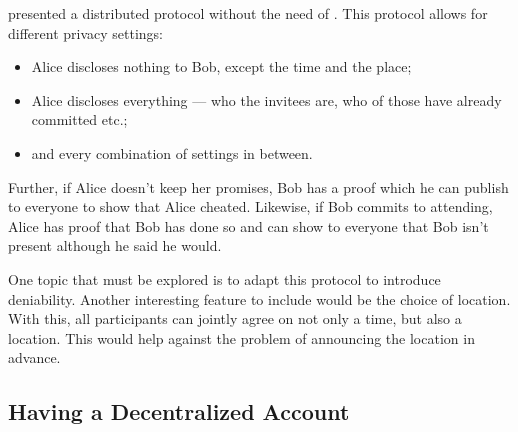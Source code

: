 \citet{EventsInvitations} presented a distributed protocol without the need of 
.
This protocol allows for different privacy settings:
\begin{itemize}
\item Alice discloses nothing to Bob, except the time and the place;
\item Alice discloses everything --- who the invitees are, who of those have 
  already committed etc.;
\item and every combination of settings in between.
\end{itemize}
Further, if Alice doesn't keep her promises, Bob has a proof which he can 
publish to everyone to show that Alice cheated.
Likewise, if Bob commits to attending, Alice has proof that Bob has done so and 
can show to everyone that Bob isn't present although he said he would.

One topic that must be explored is to adapt this protocol to introduce 
deniability.
Another interesting feature to include would be the choice of location.
With this, all participants can jointly agree on not only a time, but also 
a location.
This would help against the problem of announcing the location in advance.



\subsection{Having a Decentralized Account}
\label{passwd}

